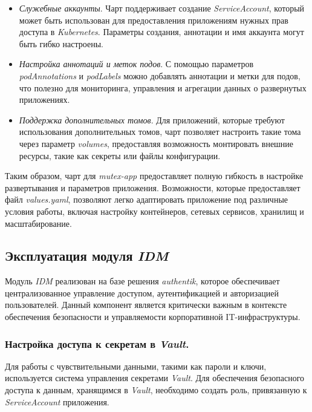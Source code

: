 \begin{itemize}
    \item \textit{Служебные аккаунты}. Чарт поддерживает создание \textit{ServiceAccount}, который может быть использован для предоставления приложениям нужных прав доступа в \textit{Kubernetes}. Параметры создания, аннотации и имя аккаунта могут быть гибко настроены.

    \item \textit{Настройка аннотаций и меток подов}. С помощью параметров \textit{podAnnotations} и \textit{podLabels} можно добавлять аннотации и метки для подов, что полезно для мониторинга, управления и агрегации данных о развернутых приложениях.

    \item \textit{Поддержка дополнительных томов}. Для приложений, которые требуют использования дополнительных томов, чарт позволяет настроить такие тома через параметр \textit{volumes}, предоставляя возможность монтировать внешние ресурсы, такие как секреты или файлы конфигурации.

\end{itemize}

Таким образом, чарт для \textit{mutex-app} предоставляет полную гибкость в настройке развертывания и параметров приложения. Возможности, которые предоставляет файл \textit{values.yaml}, позволяют легко адаптировать приложение под различные условия работы, включая настройку контейнеров, сетевых сервисов, хранилищ и масштабирование.



\subsection{Эксплуатация модуля \textit{IDM}}

Модуль \textit{IDM} реализован на базе решения \textit{authentik}, которое обеспечивает централизованное управление доступом, аутентификацией и авторизацией пользователей. Данный компонент является критически важным в контексте обеспечения безопасности и управляемости корпоративной IT-инфраструктуры.

\subsubsection{Настройка доступа к секретам в \textit{Vault}.} Для работы с чувствительными данными, такими как пароли и ключи, используется система управления секретами \textit{Vault}. Для обеспечения безопасного доступа к данным, хранящимся в \textit{Vault}, необходимо создать роль, привязанную к \textit{ServiceAccount} приложения.

